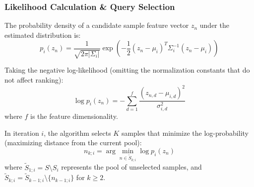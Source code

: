 \documentclass{article}
\begin{document}
\subsubsection{Likelihood Calculation \& Query Selection}
The probability density of a candidate sample feature vector $z_n$ under the estimated distribution is:
\begin{equation}
    p_i(z_n) = \frac{1}{\sqrt{2\pi |\Sigma_i|}} \exp \left( -\frac{1}{2} (z_n - \mu_i)^T \Sigma_i^{-1} (z_n - \mu_i) \right)
\end{equation}

Taking the negative log-likelihood (omitting the normalization constants that do not affect ranking):
\begin{equation}
    \log p_i(z_n) = -\sum_{d=1}^{f} \frac{(z_{n,d} - \mu_{i,d})^2}{\sigma^2_{i,d}}
\end{equation}
where $f$ is the feature dimensionality. 

In iteration $i$, the algorithm selects $K$ samples that minimize the log-probability (maximizing distance from the current pool):
\begin{equation}
    n_{k;i} = \arg\min_{n \in \tilde{S}_{k;i}} \log p_i(z_n)
\end{equation}
where $\tilde{S}_{1;i} = S \setminus S_i$ represents the pool of unselected samples, and $\tilde{S}_{k;i} = \tilde{S}_{k-1;i} \setminus \{n_{k-1;i}\}$ for $k \ge 2$.
\end{document}
